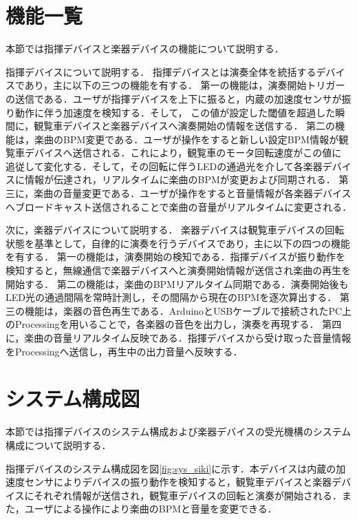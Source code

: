 \documentclass[lualatex,book,paper=a4paper,jafontsize=11.5pt,jafontscale=1.05,openany]{jlreq}
\begin{document}
\section{機能一覧}
本節では指揮デバイスと楽器デバイスの機能について説明する．\par
指揮デバイスについて説明する．
指揮デバイスとは演奏全体を統括するデバイスであり，主に以下の三つの機能を有する．
第一の機能は，演奏開始トリガーの送信である．ユーザが指揮デバイスを上下に振ると，内蔵の加速度センサが振り動作に伴う加速度を検知する．そして，
この値が設定した閾値を超過した瞬間に，観覧車デバイスと楽器デバイスへ演奏開始の情報を送信する．
第二の機能は，楽曲のBPM変更である．ユーザが操作をすると新しい設定BPM情報が観覧車デバイスへ送信される．これにより，観覧車のモータ回転速度がこの値に
追従して変化する．そして，その回転に伴うLEDの通過光を介して各楽器デバイスに情報が伝達され，リアルタイムに楽曲のBPMが変更および同期される．
第三に，楽曲の音量変更である．ユーザが操作をすると音量情報が各楽器デバイスへブロードキャスト送信されることで楽曲の音量がリアルタイムに変更される．\par

次に，楽器デバイスについて説明する．
楽器デバイスは観覧車デバイスの回転状態を基準として，自律的に演奏を行うデバイスであり，主に以下の四つの機能を有する．
第一の機能は，演奏開始の検知である．指揮デバイスが振り動作を検知すると，無線通信で楽器デバイスへと演奏開始情報が送信され楽曲の再生を開始する．
第二の機能は，楽曲のBPMリアルタイム同期である．演奏開始後もLED光の通過間隔を常時計測し，その間隔から現在のBPMを逐次算出する．
第三の機能は，楽器の音色再生である．ArduinoとUSBケーブルで接続されたPC上のProcessingを用いることで，各楽器の音色を出力し，演奏を再現する．
第四に，楽曲の音量リアルタイム反映である．指揮デバイスから受け取った音量情報をProcessingへ送信し，再生中の出力音量へ反映する．



\section{システム構成図}
本節では指揮デバイスのシステム構成および楽器デバイスの受光機構のシステム構成について説明する．

指揮デバイスのシステム構成図を図\ref{fig:sys_siki}に示す．本デバイスは内蔵の加速度センサによりデバイスの振り動作を検知すると，観覧車デバイスと楽器デバイスにそれぞれ情報が送信され，観覧車デバイスの回転と演奏が開始される．また，ユーザによる操作により楽曲のBPMと音量を変更できる．
\end{document}
